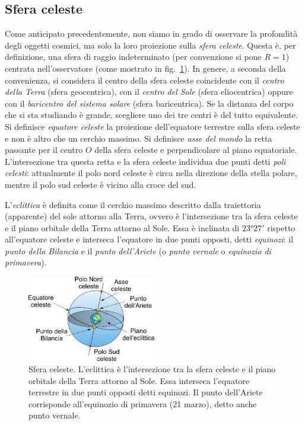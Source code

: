 \subsection{Sfera celeste}\label{sec:posizione-sfera-celeste}
Come anticipato precedentemente, non siamo in grado di osservare la profondità degli oggetti cosmici, ma solo la loro proiezione sulla \emph{sfera celeste}. Questa è, per definizione, una sfera di raggio indeterminato (per convenzione si pone $R=1$) centrata nell'osservatore (come mostrato in fig.~\ref{fig:sfera-celeste}). In genere, a seconda della convenienza, si considera il centro della sfera celeste coincidente con il \emph{centro della Terra} (sfera geocentrica), con il \emph{centro del Sole} (sfera eliocentrica) oppure con il \emph{baricentro del sistema solare} (sfera baricentrica). Se la distanza del corpo che si sta studiando è grande, scegliere uno dei tre centri è del tutto equivalente. Si definisce \emph{equatore celeste} la proiezione dell'equatore terrestre sulla sfera celeste e non è altro che un cerchio massimo. Si definisce \emph{asse del mondo} la retta passante per il centro $O$ della sfera celeste e perpendicolare al piano equatoriale. L'intersezione tra questa retta e la sfera celeste individua due punti detti \emph{poli celesti}: attualmente il polo nord celeste è circa nella direzione della stella polare, mentre il polo sud celeste è vicino alla croce del sud. 

L'\emph{eclittica} è definita come il cerchio massimo descritto dalla traiettoria (apparente) del sole attorno alla Terra, ovvero è l'intersezione tra la sfera celeste e il piano orbitale della Terra attorno al Sole. Essa è inclinata di $\ang{23;27;}$ rispetto all'equatore celeste e interseca l'equatore in due punti opposti, detti \emph{equinozi}: il \emph{punto della Bilancia} e il \emph{punto dell'Ariete} (o \emph{punto vernale} o \emph{equinozio di primavera}).

\begin{figure}
\centering
\includegraphics[width=0.5\textwidth]{immagini/sfera-celeste.png}
\caption{Sfera celeste. L'eclittica è l'intersezione tra la sfera celeste e il piano orbitale della Terra attorno al Sole. Essa interseca l'equatore terrestre in due punti opposti detti equinozi. Il punto dell'Ariete corrisponde all'equinozio di primavera (21 marzo), detto anche punto vernale.}
\label{fig:sfera-celeste}
\end{figure}

